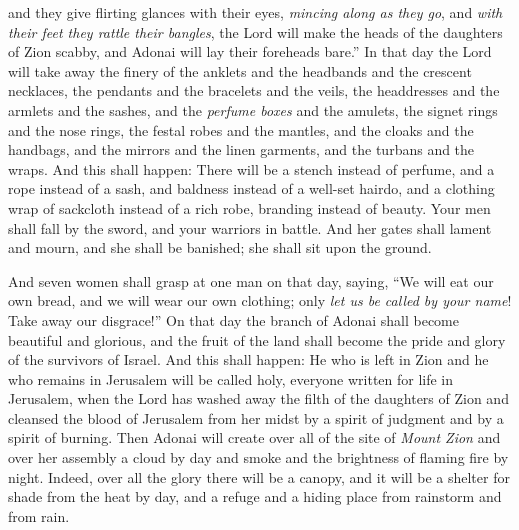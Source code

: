 \begin{biblechapter}
and they give flirting glances with their eyes, 
\textit{mincing along as they go}, 
and \textit{with their feet they rattle their bangles},
\verse the Lord will make the heads of the daughters of Zion scabby, 
and Adonai will lay their foreheads bare.”
\verse In that day the Lord will take away the finery of the anklets 
and the headbands and the crescent necklaces,
\verse the pendants and the bracelets and the veils,
\verse the headdresses and the armlets and the sashes, 
and the \textit{perfume boxes} and the amulets,
\verse the signet rings and the nose rings,
\verse the festal robes and the mantles, 
and the cloaks and the handbags,
\verse and the mirrors and the linen garments, 
and the turbans and the wraps.
\verse And this shall happen: There will be 
a stench instead of perfume, 
and a rope instead of a sash, 
and baldness instead of a well-set hairdo, 
and a clothing wrap of sackcloth instead of a rich robe, 
branding instead of beauty.
\verse Your men shall fall by the sword, 
and your warriors in battle.
\verse And her gates shall lament and mourn, 
and she shall be banished; 
she shall sit upon the ground.
\end{biblechapter}

\begin{biblechapter} %
\verse And seven women shall grasp at one man on that day, saying, 
“We will eat our own bread, 
and we will wear our own clothing; 
only \textit{let us be called by your name}! 
Take away our disgrace!”
 On that day the branch of Adonai shall become beautiful and glorious, 
and the fruit of the land shall become the pride and glory of the survivors of Israel.
\verse And this shall happen: He who is left in Zion 
and he who remains in Jerusalem will be called holy, 
everyone written for life in Jerusalem,
\verse when the Lord has washed away the filth of the daughters of Zion 
and cleansed the blood of Jerusalem from her midst 
by a spirit of judgment 
and by a spirit of burning.
\verse Then Adonai will create over all of the site of \textit{Mount Zion} 
and over her assembly a cloud by day 
and smoke and the brightness of flaming fire by night. 
Indeed, over all the glory there will be a canopy,
\verse and it will be a shelter for shade from the heat by day, 
and a refuge and a hiding place from rainstorm and from rain.
\end{biblechapter}

